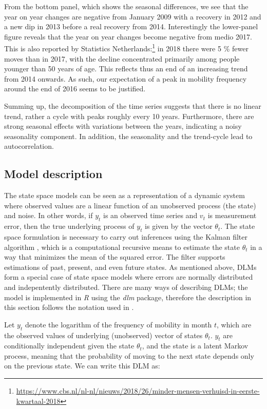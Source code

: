 \documentclass[12pt, a4paper]{article}
\begin{document}
From the bottom panel, which shows the seasonal differences, we see that
the year on year changes are negative from January 2009 with a recovery
in 2012 and a new dip in 2013 before a real recovery from 2014.
Interestingly the lower-panel figure reveals that the year on year
changes become negative from medio 2017. This is also reported by
Statistics
Netherlands:\footnote{\url{https://www.cbs.nl/nl-nl/nieuws/2018/26/minder-mensen-verhuisd-in-eerste-kwartaal-2018}}
in 2018 there were 5 \% fewer moves than in 2017, with the decline
concentrated primarily among people younger than 50 years of age. This
reflects thus an end of an increasing trend from 2014 onwards. As such,
our expectation of a peak in mobility frequency around the end of
2016 seems to be justified.

Summing up, the decomposition of the time series suggests that there is
no linear trend, rather a cycle with peaks roughly every 10 years. Furthermore, there are
strong seasonal effects with variations between the
years, indicating a noisy seasonality component. In addition, the
seasonality and the trend-cycle lead to autocorrelation.

\subsection{Model description}\label{model-description}

The state space models can be seen as a representation of a dynamic system where observed values are a linear function of an unobserved process (the state) and noise. In other words, if $y_{t}$ is an observed time series and $v_{t}$ is measurement error, then the true underlying process of $y_{t}$ is given by the vector $\theta_{t}$. The state space formulation is necessary to carry out inferences using the Kalman filter algorithm
\citep{kalman1960contributions}, which is a computational recursive means to estimate the state $\theta_{t}$ in a way that minimizes the mean of the squared error. The filter supports estimations of past, present, and even future states. As mentioned above, DLMs form a special case of state space models where errors are normally distributed and indepentently distributed. There are many ways of describing DLMs; the model
is implemented in \emph{R} using the \emph{dlm} package, therefore the
description in this section follows the notation used in
\citet{petris2009dynamic}.

Let $y_{t}$ denote the logarithm of the frequency of mobility in month
$t$, which are the observed values of underlying
(unobserved) vector of states $\theta_{t}$. $y_{t}$ are
conditionally independent given the state $\theta_{t}$, and the state
is a latent Markov process, meaning that the probability of
moving to the next state depends only on the previous state. We can
write this DLM as:
\end{document}
